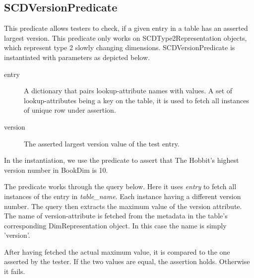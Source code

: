 \subsection{SCDVersionPredicate}\label{SCD}
This predicate allows testers to check, if a given entry in a table has an asserted largest version. This predicate only works on SCDType2Representation objects, which represent type 2 slowly changing dimensions. SCDVersionPredicate is instantiated with parameters as depicted below.


\begin{description}
\item [entry] A dictionary that pairs lookup-attribute names with values. A set of lookup-attributes being a key on the table, it is used to fetch all instances of unique row under assertion. 
\item [version] The asserted largest version value of the test entry.
\end{description}

In the instantiation, we use the predicate to assert that The Hobbit's highest version number in BookDim is 10.

The predicate works through the query below. Here it uses \textit{entry} to fetch all instances of the entry in \textit{table\_name}. Each instance having a different version number. The query then extracts the maximum value of the version attribute.  The name of version-attribute is fetched from the  metadata in the table's corresponding DimRepresentation object. In this case the name is simply 'version'.


After having fetched the actual maximum value, it is compared to the one asserted by the tester. If  the two values are equal, the assertion holds. Otherwise it fails.
